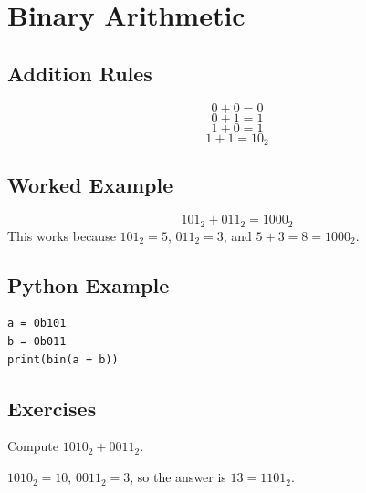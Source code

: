 \chapter{Binary Arithmetic}
\label{chap:binary-arithmetic}
\section{Addition Rules}\[0+0=0\]\[0+1=1\]\[1+0=1\]\[1+1=10_2\]
\section{Worked Example}\[101_2+011_2=1000_2\]
This works because \(101_2=5\), \(011_2=3\), and \(5+3=8=1000_2\).
\section{Python Example}\begin{lstlisting}
a = 0b101
b = 0b011
print(bin(a + b))
\end{lstlisting}
\section{Exercises}\begin{exercise}Compute \(1010_2+0011_2\).\end{exercise}\begin{solution}\(1010_2=10\), \(0011_2=3\), so the answer is \(13=1101_2\).\end{solution}
